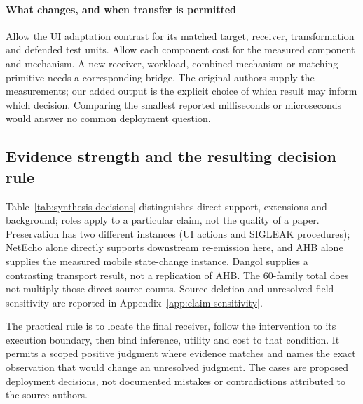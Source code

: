 \paragraph{What changes, and when transfer is permitted}
Allow the UI adaptation contrast for its matched target, receiver, transformation and defended test units. Allow each component cost for the measured component and mechanism. A new receiver, workload, combined mechanism or matching primitive needs a corresponding bridge. The original authors supply the measurements; our added output is the explicit choice of which result may inform which decision. Comparing the smallest reported milliseconds or microseconds would answer no common deployment question.

\subsection{Evidence strength and the resulting decision rule}
Table~\ref{tab:synthesis-decisions} distinguishes direct support, extensions and background; roles apply to a particular claim, not the quality of a paper. Preservation has two different instances (UI actions and SIGLEAK procedures); NetEcho alone directly supports downstream re-emission here, and AHB alone supplies the measured mobile state-change instance. Dangol supplies a contrasting transport result, not a replication of AHB. The 60-family total does not multiply those direct-source counts. Source deletion and unresolved-field sensitivity are reported in Appendix~\ref{app:claim-sensitivity}.


The practical rule is to locate the final receiver, follow the intervention to its execution boundary, then bind inference, utility and cost to that condition. It permits a scoped positive judgment where evidence matches and names the exact observation that would change an unresolved judgment. The cases are proposed deployment decisions, not documented mistakes or contradictions attributed to the source authors.
